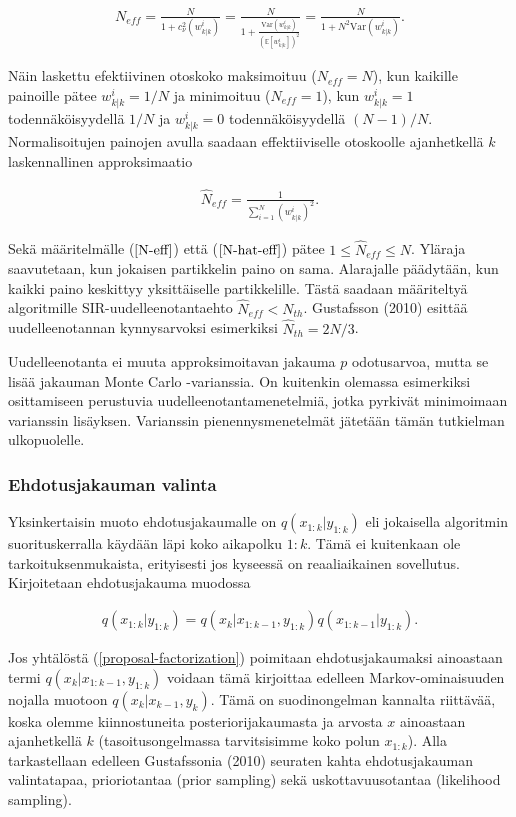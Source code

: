 \documentclass[
  12pt,
  a4paper, twoside]{book}
\begin{document}
\begin{align}\label{N-eff}
N_{eff}= \frac{N}{1+c_\nu^2(w^i_{k|k})} = \frac{N}{1+\frac{\text{Var}(w^i_{k|k})}{(\mathbb{E}[w^i_{k|k}])^2}} =\frac{N}{1+N^2\text{Var}(w^i_{k|k})}.
\end{align}

Näin laskettu efektiivinen otoskoko maksimoituu (\(N_{eff}=N\)), kun kaikille painoille pätee \(w^i_{k|k}=1/N\) ja minimoituu (\(N_{eff}=1\)), kun \(w^i_{k|k}=1\) todennäköisyydellä \(1/N\) ja \(w^i_{k|k}=0\) todennäköisyydellä \((N-1)/N\). Normalisoitujen painojen avulla saadaan effektiiviselle otoskoolle ajanhetkellä \(k\) laskennallinen approksimaatio

\begin{align}\label{N-hat-eff}
\hat{N}_{eff}=\frac{1}{\sum_{i=1}^N(w^i_{k|k})^2}.
\end{align}

Sekä määritelmälle (\(\ref{N-eff}\)) että (\(\ref{N-hat-eff}\)) pätee \(1 \leq \hat{N}_{eff} \leq N\). Yläraja saavutetaan, kun jokaisen partikkelin paino on sama. Alarajalle päädytään, kun kaikki paino keskittyy yksittäiselle partikkelille. Tästä saadaan määriteltyä algoritmille SIR-uudelleenotantaehto \(\hat{N}_{eff}< N_{th}\). Gustafsson (2010) esittää uudelleenotannan kynnysarvoksi esimerkiksi \(\hat{N}_{th}=2N/3\).

Uudelleenotanta ei muuta approksimoitavan jakauma \(p\) odotusarvoa, mutta se lisää jakauman Monte Carlo -varianssia. On kuitenkin olemassa esimerkiksi osittamiseen perustuvia uudelleenotantamenetelmiä, jotka pyrkivät minimoimaan varianssin lisäyksen. Varianssin pienennysmenetelmät jätetään tämän tutkielman ulkopuolelle.

\subsubsection{Ehdotusjakauman valinta}

Yksinkertaisin muoto ehdotusjakaumalle on \(q(x_{1:k}|y_{1:k})\) eli jokaisella algoritmin suorituskerralla käydään läpi koko aikapolku \(1:k\). Tämä ei kuitenkaan ole tarkoituksenmukaista, erityisesti jos kyseessä on reaaliaikainen sovellutus. Kirjoitetaan ehdotusjakauma muodossa

\begin{align}\label{proposal-factorization}
q(x_{1:k}|y_{1:k})=q(x_k|x_{1:k-1},y_{1:k})q(x_{1:k-1}|y_{1:k}).
\end{align}

Jos yhtälöstä (\ref{proposal-factorization}) poimitaan ehdotusjakaumaksi ainoastaan termi \(q(x_k|x_{1:k-1},y_{1:k})\) voidaan tämä kirjoittaa edelleen Markov-ominaisuuden nojalla muotoon \(q(x_k|x_{k-1},y_{k})\). Tämä on suodinongelman kannalta riittävää, koska olemme kiinnostuneita posteriorijakaumasta ja arvosta \(x\) ainoastaan ajanhetkellä \(k\) (tasoitusongelmassa tarvitsisimme koko polun \(x_{1:k}\)). Alla tarkastellaan edelleen Gustafssonia (2010) seuraten kahta ehdotusjakauman valintatapaa, prioriotantaa (prior sampling) sekä uskottavuusotantaa (likelihood sampling).
\end{document}
